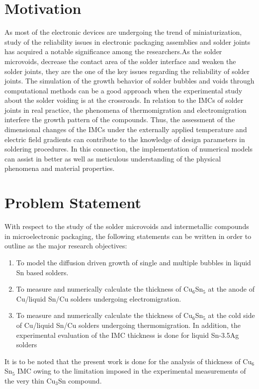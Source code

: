 \section{Motivation}\label{Chap1_01}
As most of the electronic devices are undergoing the trend of miniaturization, study of the reliability issues in electronic packaging assemblies and solder joints has acquired a notable significance among the researchers.As the solder microvoids, decrease the contact area of the solder interface and weaken the solder joints, they are the one of the key issues regarding the reliability of solder joints. The simulation of the growth behavior of solder bubbles and voids through computational methods can be a good approach when the experimental study about the solder voiding is at the crossroads. In relation to the IMCs of solder joints in real practice, the phenomena of thermomigration and electromigration interfere the growth pattern of the compounds. Thus, the assessment of the dimensional changes of the IMCs under the externally applied temperature  and electric field  gradients can contribute to the knowledge of design parameters in soldering procedures. In this connection, the implementation of numerical models can assist in better  as well as meticulous understanding of the physical phenomena and material properties.

\section{Problem Statement}\label{Chap1_01}
With respect to the study of the solder microvoids and intermetallic compounds in microelectronic packaging, the following statements can be written in order to outline as the major research objectives:
\begin{enumerate}
\item To model the diffusion driven growth of single and multiple bubbles in liquid Sn based solders. 
\item To measure and numerically calculate the thickness of Cu$_6$Sn$_5$ at the anode of Cu/liquid Sn/Cu solders undergoing electromigration.
\item To measure and numerically calculate the thickness of Cu$_6$Sn$_5$ at the cold side of Cu/liquid Sn/Cu solders undergoing thermomigration. In addition, the experimental evaluation of the IMC thickness is done for liquid Sn-3.5Ag solders
\end{enumerate}

It is to be noted that the present work is done for the analysis of thickness of Cu$_6$Sn$_5$ IMC owing to the limitation imposed in the experimental measurements of the very thin Cu$_3$Sn compound. 

